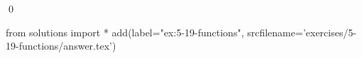 
\begin{ex}
  \label{ex:5-19-functions}
  
  \qed
\end{ex}
\begin{python0}
from solutions import *
add(label="ex:5-19-functions",
    srcfilename='exercises/5-19-functions/answer.tex')
\end{python0}
